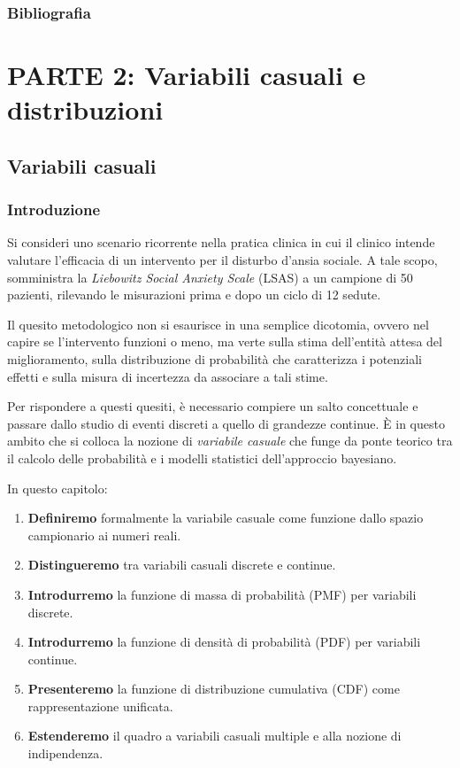 \documentclass[
  italian,
  letterpaper,
  a4paper,
  11pt,
  open=any]{scrbook}
\providecommand{\tightlist}{%
  \setlength{\itemsep}{0pt}\setlength{\parskip}{0pt}}
\theoremstyle{plain}
\theoremstyle{definition}
\theoremstyle{definition}
\theoremstyle{remark}
\begin{document}
\section*{Bibliografia}\label{bibliografia-2}


\part{PARTE 2: Variabili casuali e distribuzioni}

\chapter{Variabili casuali}\label{sec-prob-random-var}

\section*{Introduzione}\label{introduzione-5}


Si consideri uno scenario ricorrente nella pratica clinica in cui il
clinico intende valutare l'efficacia di un intervento per il disturbo
d'ansia sociale. A tale scopo, somministra la \emph{Liebowitz Social
Anxiety Scale} (LSAS) a un campione di 50 pazienti, rilevando le
misurazioni prima e dopo un ciclo di 12 sedute.

Il quesito metodologico non si esaurisce in una semplice dicotomia,
ovvero nel capire se l'intervento funzioni o meno, ma verte sulla stima
dell'entità attesa del miglioramento, sulla distribuzione di probabilità
che caratterizza i potenziali effetti e sulla misura di incertezza da
associare a tali stime.

Per rispondere a questi quesiti, è necessario compiere un salto
concettuale e passare dallo studio di eventi discreti a quello di
grandezze continue. È in questo ambito che si colloca la nozione di
\emph{variabile casuale} che funge da ponte teorico tra il calcolo delle
probabilità e i modelli statistici dell'approccio bayesiano.

In questo capitolo:

\begin{enumerate}
\def\labelenumi{\arabic{enumi}.}
\tightlist
\item
  \textbf{Definiremo} formalmente la variabile casuale come funzione
  dallo spazio campionario ai numeri reali.
\item
  \textbf{Distingueremo} tra variabili casuali discrete e continue.
\item
  \textbf{Introdurremo} la funzione di massa di probabilità (PMF) per
  variabili discrete.
\item
  \textbf{Introdurremo} la funzione di densità di probabilità (PDF) per
  variabili continue.
\item
  \textbf{Presenteremo} la funzione di distribuzione cumulativa (CDF)
  come rappresentazione unificata.
\item
  \textbf{Estenderemo} il quadro a variabili casuali multiple e alla
  nozione di indipendenza.
\end{enumerate}
\end{document}
